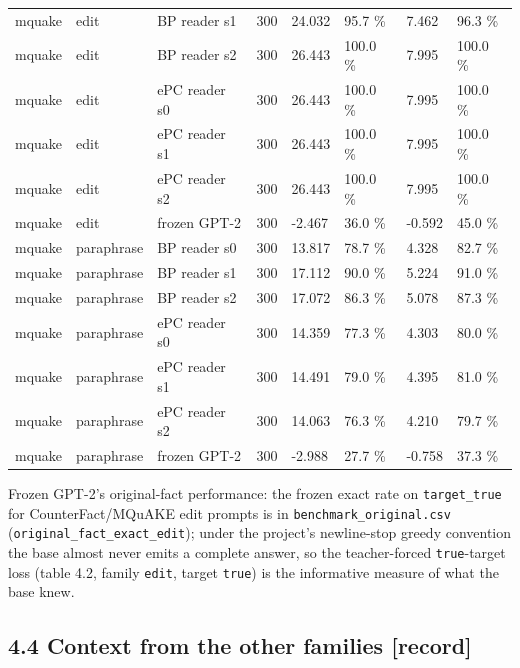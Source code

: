 \documentclass[10pt,a4paper]{article}
\begin{document}
\begin{center}
\begin{tabularx}{\textwidth}{@{}p{}XXXXXXX@{}}
mquake & edit & BP reader s1 & 300 & 24.032 & 95.7 \% & 7.462 & 96.3 \% \\
mquake & edit & BP reader s2 & 300 & 26.443 & 100.0 \% & 7.995 & 100.0 \% \\
mquake & edit & ePC reader s0 & 300 & 26.443 & 100.0 \% & 7.995 & 100.0 \% \\
mquake & edit & ePC reader s1 & 300 & 26.443 & 100.0 \% & 7.995 & 100.0 \% \\
mquake & edit & ePC reader s2 & 300 & 26.443 & 100.0 \% & 7.995 & 100.0 \% \\
mquake & edit & frozen GPT-2 & 300 & -2.467 & 36.0 \% & -0.592 & 45.0 \% \\
mquake & paraphrase & BP reader s0 & 300 & 13.817 & 78.7 \% & 4.328 & 82.7 \% \\
mquake & paraphrase & BP reader s1 & 300 & 17.112 & 90.0 \% & 5.224 & 91.0 \% \\
mquake & paraphrase & BP reader s2 & 300 & 17.072 & 86.3 \% & 5.078 & 87.3 \% \\
mquake & paraphrase & ePC reader s0 & 300 & 14.359 & 77.3 \% & 4.303 & 80.0 \% \\
mquake & paraphrase & ePC reader s1 & 300 & 14.491 & 79.0 \% & 4.395 & 81.0 \% \\
mquake & paraphrase & ePC reader s2 & 300 & 14.063 & 76.3 \% & 4.210 & 79.7 \% \\
mquake & paraphrase & frozen GPT-2 & 300 & -2.988 & 27.7 \% & -0.758 & 37.3 \% \\
\bottomrule
\end{tabularx}
\end{center}



Frozen GPT-2's original-fact performance: the frozen exact rate on \texttt{target\_true} for CounterFact/MQuAKE edit prompts is in \texttt{benchmark\_original.csv} (\texttt{original\_fact\_exact\_edit}); under the project's newline-stop greedy convention the base almost never emits a complete answer, so the teacher-forced \texttt{true}-target loss (table 4.2, family \texttt{edit}, target \texttt{true}) is the informative measure of what the base knew.



\subsection*{4.4 Context from the other families [record]}
\end{document}
